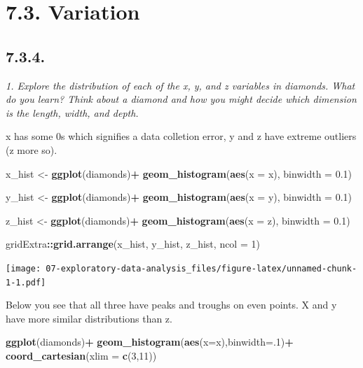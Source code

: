 \documentclass[]{book}
\newenvironment{Shaded}{\begin{snugshade}}{\end{snugshade}}
\newcommand{\DataTypeTok}[1]{\textcolor[rgb]{0.13,0.29,0.53}{#1}}
\newcommand{\DecValTok}[1]{\textcolor[rgb]{0.00,0.00,0.81}{#1}}
\newcommand{\FloatTok}[1]{\textcolor[rgb]{0.00,0.00,0.81}{#1}}
\newcommand{\KeywordTok}[1]{\textcolor[rgb]{0.13,0.29,0.53}{\textbf{#1}}}
\newcommand{\NormalTok}[1]{#1}
\newcommand{\OperatorTok}[1]{\textcolor[rgb]{0.81,0.36,0.00}{\textbf{#1}}}
\newcommand{\StringTok}[1]{\textcolor[rgb]{0.31,0.60,0.02}{#1}}
\theoremstyle{definition}
\theoremstyle{definition}
\theoremstyle{definition}
\theoremstyle{remark}
\begin{document}
\hypertarget{variation}{%
\section{7.3. Variation}\label{variation}}

\hypertarget{section-21}{%
\subsection{7.3.4.}\label{section-21}}

\emph{1. Explore the distribution of each of the x, y, and z variables
in diamonds. What do you learn? Think about a diamond and how you might
decide which dimension is the length, width, and depth.}

x has some 0s which signifies a data colletion error, y and z have
extreme outliers (z more so).

\begin{Shaded}
\begin{Highlighting}[]
\NormalTok{x_hist <-}\StringTok{ }\KeywordTok{ggplot}\NormalTok{(diamonds)}\OperatorTok{+}
\StringTok{  }\KeywordTok{geom_histogram}\NormalTok{(}\KeywordTok{aes}\NormalTok{(}\DataTypeTok{x =}\NormalTok{ x), }\DataTypeTok{binwidth =} \FloatTok{0.1}\NormalTok{)}

\NormalTok{y_hist <-}\StringTok{ }\KeywordTok{ggplot}\NormalTok{(diamonds)}\OperatorTok{+}
\StringTok{  }\KeywordTok{geom_histogram}\NormalTok{(}\KeywordTok{aes}\NormalTok{(}\DataTypeTok{x =}\NormalTok{ y), }\DataTypeTok{binwidth =} \FloatTok{0.1}\NormalTok{)}

\NormalTok{z_hist <-}\StringTok{ }\KeywordTok{ggplot}\NormalTok{(diamonds)}\OperatorTok{+}
\StringTok{  }\KeywordTok{geom_histogram}\NormalTok{(}\KeywordTok{aes}\NormalTok{(}\DataTypeTok{x =}\NormalTok{ z), }\DataTypeTok{binwidth =} \FloatTok{0.1}\NormalTok{)}


\NormalTok{gridExtra}\OperatorTok{::}\KeywordTok{grid.arrange}\NormalTok{(x_hist, y_hist, z_hist, }\DataTypeTok{ncol =} \DecValTok{1}\NormalTok{)}
\end{Highlighting}
\end{Shaded}

\texttt{[image: 07-exploratory-data-analysis\_files/figure-latex/unnamed-chunk-1-1.pdf]}

Below you see that all three have peaks and troughs on even points. X
and y have more similar distributions than z.

\begin{Shaded}
\begin{Highlighting}[]
\KeywordTok{ggplot}\NormalTok{(diamonds)}\OperatorTok{+}
\StringTok{  }\KeywordTok{geom_histogram}\NormalTok{(}\KeywordTok{aes}\NormalTok{(}\DataTypeTok{x=}\NormalTok{x),}\DataTypeTok{binwidth=}\NormalTok{.}\DecValTok{1}\NormalTok{)}\OperatorTok{+}
\StringTok{  }\KeywordTok{coord_cartesian}\NormalTok{(}\DataTypeTok{xlim =} \KeywordTok{c}\NormalTok{(}\DecValTok{3}\NormalTok{,}\DecValTok{11}\NormalTok{))}
\end{Highlighting}
\end{Shaded}
\end{document}
